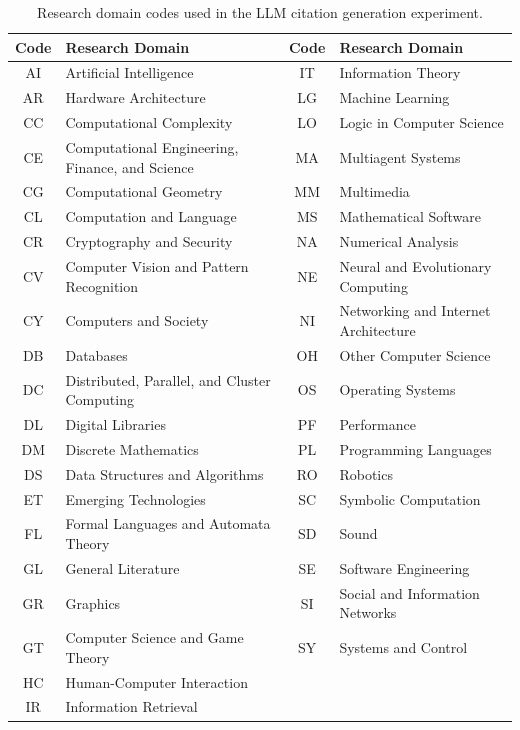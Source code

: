 \begin{table}[t]
\centering
\caption{Research domain codes used in the LLM citation generation experiment.}
\label{tab:domain_codes}
\small
{}
\begin{tabular}{cl|cl}
\toprule
\textbf{Code} & \textbf{Research Domain} & \textbf{Code} & \textbf{Research Domain} \\
\midrule
AI & Artificial Intelligence & IT & Information Theory \\
AR & Hardware Architecture & LG & Machine Learning \\
CC & Computational Complexity & LO & Logic in Computer Science \\
CE & Computational Engineering, Finance, and Science & MA & Multiagent Systems \\
CG & Computational Geometry & MM & Multimedia \\
CL & Computation and Language & MS & Mathematical Software \\
CR & Cryptography and Security & NA & Numerical Analysis \\
CV & Computer Vision and Pattern Recognition & NE & Neural and Evolutionary Computing \\
CY & Computers and Society & NI & Networking and Internet Architecture \\
DB & Databases & OH & Other Computer Science \\
DC & Distributed, Parallel, and Cluster Computing & OS & Operating Systems \\
DL & Digital Libraries & PF & Performance \\
DM & Discrete Mathematics & PL & Programming Languages \\
DS & Data Structures and Algorithms & RO & Robotics \\
ET & Emerging Technologies & SC & Symbolic Computation \\
FL & Formal Languages and Automata Theory & SD & Sound \\
GL & General Literature & SE & Software Engineering \\
GR & Graphics & SI & Social and Information Networks \\
GT & Computer Science and Game Theory & SY & Systems and Control \\
HC & Human-Computer Interaction & & \\
IR & Information Retrieval & & \\
\bottomrule
\end{tabular}
\end{table}

